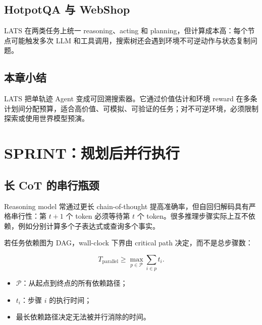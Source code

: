 \documentclass[a4paper]{article}
\begin{document}
\subsection{HotpotQA 与 WebShop}



LATS 在两类任务上统一 reasoning、acting 和 planning，但计算成本高：每个节点可能触发多次 LLM 和工具调用，搜索树还会遇到环境不可逆动作与状态复制问题。

\subsection{本章小结}

LATS 把单轨迹 Agent 变成可回溯搜索器。它通过价值估计和环境 reward 在多条计划间分配预算，适合高价值、可模拟、可验证的任务；对不可逆环境，必须限制探索或使用世界模型预演。

\section{SPRINT：规划后并行执行}

\subsection{长 CoT 的串行瓶颈}

Reasoning model 常通过更长 chain-of-thought 提高准确率，但自回归解码具有严格串行性：第 $t+1$ 个 token 必须等待第 $t$ 个 token。很多推理步骤实际上互不依赖，例如分别计算多个子表达式或查询多个事实。


若任务依赖图为 DAG，wall-clock 下界由 critical path 决定，而不是总步骤数：

$$
T_{\mathrm{parallel}}\ge \max_{p\in\mathcal P}\sum_{i\in p} t_i.
$$

\begin{itemize}
    \item $\mathcal P$：从起点到终点的所有依赖路径；
    \item $t_i$：步骤 $i$ 的执行时间；
    \item 最长依赖路径决定无法被并行消除的时间。
\end{itemize}
\end{document}
